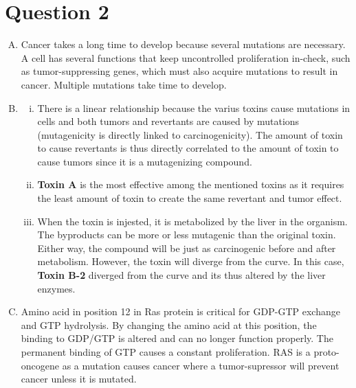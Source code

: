 \documentclass{article}
\begin{document}
\section*{ Question 2 }

\begin{enumerate}[A.]
    \item Cancer takes a long time to develop because several mutations are
        necessary. A cell has several functions that keep uncontrolled
        proliferation in-check, such as tumor-suppressing genes, which must also
        acquire mutations to result in cancer. Multiple mutations take time to
        develop.

    \item 
        \begin{enumerate}[i.]
            \item There is a linear relationship because the varius toxins cause
                mutations in cells and both tumors and revertants are caused by
                mutations (mutagenicity is directly linked to carcinogenicity).
                The amount of toxin to cause revertants is thus directly
                correlated to the amount of toxin to cause tumors since it is a
                mutagenizing compound.

            \item \textbf{Toxin A} is the most effective among the mentioned
                toxins as it requires the least amount of toxin to create the
                same revertant and tumor effect.

            \item When the toxin is injested, it is metabolized by the liver in
                the organism. The byproducts can be more or less mutagenic than
                the original toxin. Either way, the compound will be just as
                carcinogenic before and after metabolism. However, the toxin
                will diverge from the curve. In this case, \textbf{Toxin B-2}
                diverged from the curve and its thus altered by the liver
                enzymes.
        
        \end{enumerate}

    \item Amino acid in position 12 in Ras protein is critical for GDP-GTP
        exchange and GTP hydrolysis. By changing the amino acid at this
        position, the binding to GDP/GTP is altered and can no longer function
        properly. The permanent binding of GTP causes a constant proliferation.
        RAS is a proto-oncogene as a mutation causes cancer where a
        tumor-supressor will prevent cancer unless it is mutated.


\end{enumerate}
\end{document}
